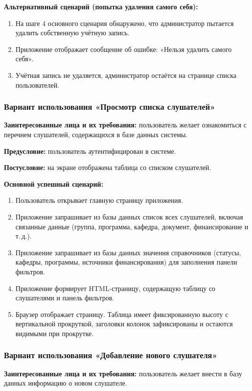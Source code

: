 \textbf{Альтернативный сценарий (попытка удаления самого себя):}
\begin{enumerate}
	\item На шаге 4 основного сценария обнаружено, что администратор пытается удалить собственную учётную запись.
	\item Приложение отображает сообщение об ошибке: «Нельзя удалить самого себя».
	\item Учётная запись не удаляется, администратор остаётся на странице списка пользователей.
\end{enumerate}

\subsubsection{Вариант использования «Просмотр списка слушателей»}

\textbf{Заинтересованные лица и их требования:} пользователь желает ознакомиться с перечнем слушателей, содержащихся в базе данных системы.

\textbf{Предусловие:} пользователь аутентифицирован в системе.

\textbf{Постусловие:} на экране отображена таблица со списком слушателей.

\textbf{Основной успешный сценарий:}
\begin{enumerate}
	\item Пользователь открывает главную страницу приложения.
	\item Приложение запрашивает из базы данных список всех слушателей, включая связанные данные (группа, программа, кафедра, документ, финансирование и т.\,д.).
	\item Приложение запрашивает из базы данных значения справочников (статусы, кафедры, программы, источники финансирования) для заполнения панели фильтров.
	\item Приложение формирует HTML-страницу, содержащую таблицу со слушателями и панель фильтров.
	\item Браузер отображает страницу. Таблица имеет фиксированную высоту с вертикальной прокруткой, заголовки колонок зафиксированы и остаются видимыми при прокрутке.
\end{enumerate}

\subsubsection{Вариант использования «Добавление нового слушателя»}

\textbf{Заинтересованные лица и их требования:} пользователь желает внести в базу данных информацию о новом слушателе.

